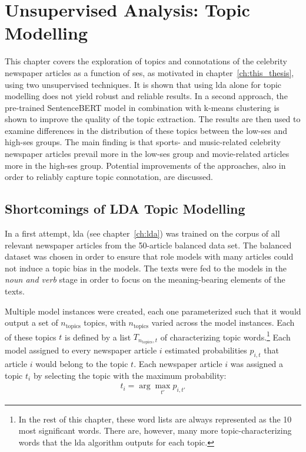 \renewcommand{\imagepath}{../50-unsupervised/img}
\newcommand{\ntopics}{n_\text{topics}}
\newcommand{\nclusters}{n_\text{clusters}}

\chapter{Unsupervised Analysis: Topic Modelling}\label{ch:unsupervised}
This chapter covers the exploration of topics and connotations of the celebrity newspaper articles as a function of \gls{ses}, as motivated in chapter~\ref{ch:this_thesis}, using two unsupervised techniques. It is shown that using \gls{lda} alone for topic modelling does not yield robust and reliable results. In a second approach, the pre-trained SentenceBERT model in combination with k-means clustering is shown to improve the quality of the topic extraction. The results are then used to examine differences in the distribution of these topics between the low-\gls{ses} and high-\gls{ses} groups. The main finding is that sports- and music-related celebrity newspaper articles prevail more in the low-\gls{ses} group and movie-related articles more in the high-\gls{ses} group. Potential improvements of the approaches, also in order to reliably capture topic connotation, are discussed.


\section{Shortcomings of LDA Topic Modelling}
In a first attempt, \gls{lda} (see chapter~\ref{ch:lda}) was trained on the corpus of all relevant newspaper articles from the 50-article balanced data set. The balanced dataset was chosen in order to ensure that role models with many articles could not induce a topic bias in the models. The texts were fed to the models in the \textit{noun and verb} stage in order to focus on the meaning-bearing elements of the texts.

Multiple model instances were created, each one parameterized such that it would output a set of $\ntopics$ topics, with $\ntopics$ varied across the model instances. Each of these topics $t$ is defined by a list $T_{\ntopics, t}$ of characterizing topic words.\footnote{In the rest of this chapter, these word lists are always represented as the 10 most significant words. There are, however, many more topic-characterizing words that the \gls{lda} algorithm outputs for each topic.} Each model assigned to every newspaper article $i$ estimated probabilities $p_{i, t}$ that article $i$ would belong to the topic $t$. Each newspaper article $i$ was assigned a topic $t_i$ by selecting the topic with the maximum probability:
\begin{align}
    t_i = \arg \max_{t'} p_{i, t'}
\end{align}

